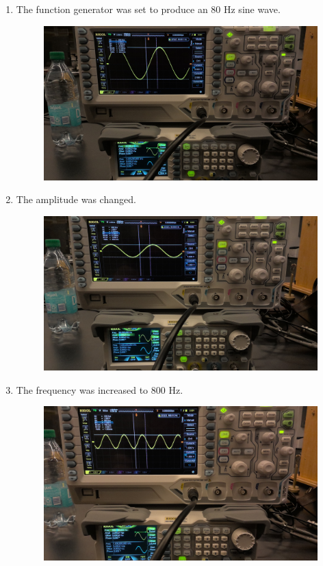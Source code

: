 \documentclass{article}
\begin{document}
            \begin{enumerate}[label=(\alph*)]
                \item The function generator was set to produce an 80 Hz sine wave.
                \begin{figure}[h]
                    \centering
                    \includegraphics[width=0.2\linewidth]{a.jpg}
                \end{figure}

                \item The amplitude was changed.
                \begin{figure}[h]
                    \centering
                    \includegraphics[width=0.2\linewidth]{b.jpg}
                \end{figure}
                
                \item The frequency was increased to 800 Hz.
                \begin{figure}[h]
                    \centering
                    \includegraphics[width=0.2\linewidth]{c.jpg}
                \end{figure}
                

\end{enumerate}
\end{document}

